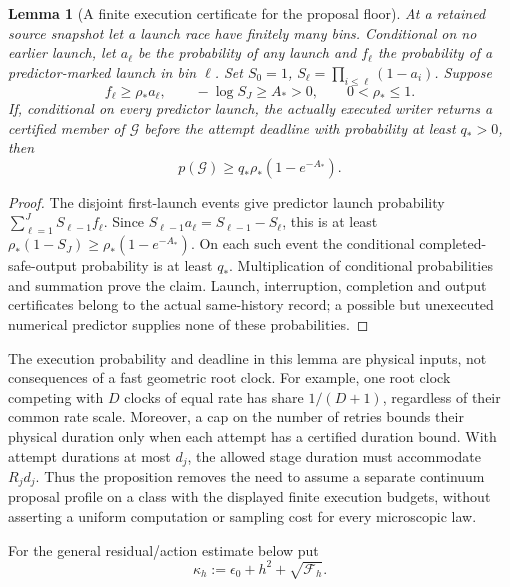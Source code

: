 \documentclass[11pt]{article}
\newtheorem{lemma}[lemma]{Lemma}
\theoremstyle{definition}
\theoremstyle{remark}
\begin{document}
\begin{lemma}[A finite execution certificate for the proposal floor]
\label{lem:supp-executed-proposal-floor}
At a retained source snapshot let a launch race have finitely many bins.
Conditional on no earlier launch, let $a_\ell$ be the probability of any
launch and $f_\ell$ the probability of a predictor-marked launch in bin
$\ell$.  Set $S_0=1$, $S_\ell=\prod_{i\le\ell}(1-a_i)$.
Suppose
\begin{equation}
 f_\ell\ge\rho_*a_\ell,\qquad
 -\log S_J\ge A_*>0,\qquad 0<\rho_*\le1.
 \label{eq:supp-launch-share}
\end{equation}
If, conditional on every predictor launch, the actually executed writer
returns a certified member of $\mathcal G$ before the attempt deadline with
probability at least $q_*>0$, then
\begin{equation}
 \boxed{p(\mathcal G)\ge q_*\rho_*(1-e^{-A_*}).}
 \label{eq:supp-executed-proposal-floor}
\end{equation}
\end{lemma}
\begin{proof}
The disjoint first-launch events give predictor launch probability
$\sum_{\ell=1}^J S_{\ell-1}f_\ell$.  Since
$S_{\ell-1}a_\ell=S_{\ell-1}-S_\ell$, this is at least
$\rho_*(1-S_J)\ge\rho_*(1-e^{-A_*})$.  On each such event the conditional
completed-safe-output probability is at least $q_*$.  Multiplication of
conditional probabilities and summation prove the claim.  Launch,
interruption, completion and output certificates belong to the actual
same-history record; a possible but unexecuted numerical predictor supplies
none of these probabilities.
\end{proof}

The execution probability and deadline in this lemma are physical inputs,
not consequences of a fast geometric root clock.  For example, one root clock
competing with $D$ clocks of equal rate has share $1/(D+1)$, regardless of
their common rate scale.  Moreover, a cap on the number of retries bounds their
physical duration only when each attempt has a certified duration bound.  With
attempt durations at most $d_j$, the allowed stage duration must accommodate
$R_jd_j$.  Thus the proposition removes the need to assume a separate
continuum proposal profile on a class with the displayed finite execution
budgets, without asserting a uniform computation or sampling cost for every
microscopic law.

For the general residual/action estimate below put
\begin{equation}
 \kappa_h:=\epsilon_0+h^2+\sqrt{\mathcal F_h}.
 \label{eq:supp-gowdy-kappa}
\end{equation}
\end{document}
